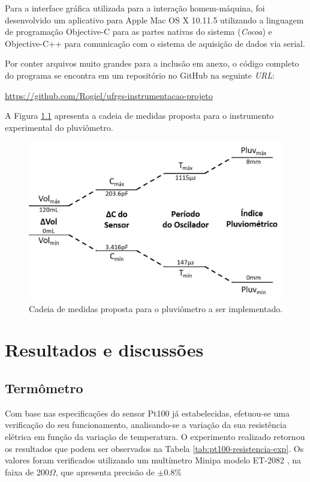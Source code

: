 \documentclass[a4paper]{instrumentacao}
\begin{document}
Para a interface gráfica utilizada para a interação homem-máquina, foi desenvolvido um aplicativo para Apple Mac OS X 10.11.5 utilizando a linguagem de programação Objective-C para as partes nativas do sistema (\textit{Cocoa}) e Objective-C++ para comunicação com o sistema de aquisição de dados via serial.

Por conter arquivos muito grandes para a inclusão em anexo, o código completo do programa se encontra em um repositório no GitHub na seguinte \textit{URL}:

\url{https://github.com/Rogiel/ufrgs-instrumentacao-projeto}

A Figura \ref{} apresenta a cadeia de medidas proposta para o instrumento experimental do pluviômetro.

\begin{figure}[H]
	\centering
	\includegraphics[width=\textwidth]{pluviometro-cadeia-medidas-proposta.jpg}
	\caption{Cadeia de medidas proposta para o pluviômetro a ser implementado.}
	\label{fig:pluviometro-cadeia-medidas-proposta}
\end{figure}

\chapter{Resultados e discussões}

\section{Termômetro}

Com base nas especificações do sensor Pt100 já estabelecidas, efetuou-se uma verificação do seu funcionamento, analisando-se a variação da sua resistência elétrica em função da variação de temperatura. O experimento realizado retornou os resultados que podem ser observados na Tabela \ref{tab:pt100-resistencia-exp}. Os valores foram verificados utilizando um multímetro Minipa modelo ET-2082 \cite{multimetro-minipa}, na faixa de 200$\Omega$, que apresenta precisão de $\pm 0.8\%$
\end{document}
